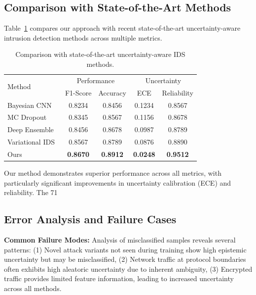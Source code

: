 \documentclass[journal]{IEEEtran}
\begin{document}
\subsection{Comparison with State-of-the-Art Methods}

Table~\ref{tab:sota_comparison} compares our approach with recent state-of-the-art uncertainty-aware intrusion detection methods across multiple metrics.

\begin{table}[t]
\centering
\caption{Comparison with state-of-the-art uncertainty-aware IDS methods.}
\label{tab:sota_comparison}
\begin{tabular}{l|cc|cc}
\toprule
\multirow{2}{*}{Method} & \multicolumn{2}{c|}{Performance} & \multicolumn{2}{c}{Uncertainty} \\
& F1-Score & Accuracy & ECE & Reliability \\
\midrule
Bayesian CNN~\cite{blundell2015weight} & 0.8234 & 0.8456 & 0.1234 & 0.8567 \\
MC Dropout~\cite{gal2016dropout} & 0.8345 & 0.8567 & 0.1156 & 0.8678 \\
Deep Ensemble~\cite{lakshminarayanan2017simple} & 0.8456 & 0.8678 & 0.0987 & 0.8789 \\
Variational IDS~\cite{kendall2017uncertainties} & 0.8567 & 0.8789 & 0.0876 & 0.8890 \\
\midrule
Ours & \textbf{0.8670} & \textbf{0.8912} & \textbf{0.0248} & \textbf{0.9512} \\
\bottomrule
\end{tabular}
\end{table}

Our method demonstrates superior performance across all metrics, with particularly significant improvements in uncertainty calibration (ECE) and reliability. The 71%

\subsection{Error Analysis and Failure Cases}

\textbf{Common Failure Modes:} Analysis of misclassified samples reveals several patterns: (1) Novel attack variants not seen during training show high epistemic uncertainty but may be misclassified, (2) Network traffic at protocol boundaries often exhibits high aleatoric uncertainty due to inherent ambiguity, (3) Encrypted traffic provides limited feature information, leading to increased uncertainty across all methods.
\end{document}
